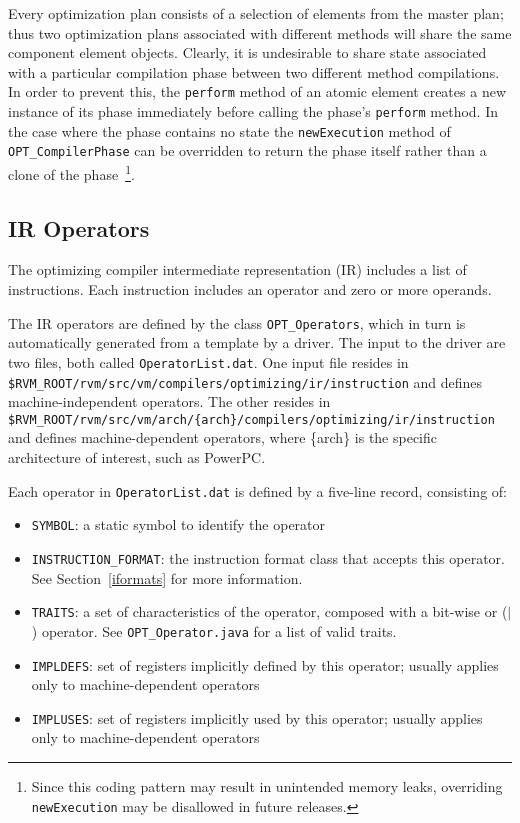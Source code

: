 Every optimization plan consists of a selection of elements from the master 
plan;
thus two optimization plans associated with different methods 
will share the same component element objects. 
Clearly, it is undesirable to share state 
associated with a particular compilation phase between two
different method compilations. In order to prevent this, the {\tt perform}
method of an atomic element creates a new instance of its phase immediately 
before calling the phase's {\tt perform} method. 
In the case where the phase
contains no state the {\tt newExecution} method of 
{\tt OPT\_CompilerPhase} can be overridden to return the phase itself rather 
than a clone of the phase~\footnote{Since this coding pattern may result
in unintended memory leaks, overriding {\tt newExecution} may be
disallowed in future releases.}.


\subsection{IR Operators}

The optimizing compiler intermediate representation (IR) includes a list
of instructions.  Each instruction includes an operator and zero or
more operands.

The IR operators are defined by the class {\tt OPT\_Operators}, which in
turn is automatically generated from a template by a driver.  The input to the
driver are two files, both called {\tt OperatorList.dat}.  One input
file resides in {\tt \$RVM\_ROOT/rvm/src/vm/compilers/optimizing/ir/instruction} and defines machine-independent
operators.  The other resides in {\tt \$RVM\_ROOT/rvm/src/vm/arch/\{arch\}/compilers/optimizing/ir/instruction}
and defines machine-dependent operators, where \{arch\} is the
specific architecture of interest, such as PowerPC\TMweb.

Each operator in {\tt OperatorList.dat} is defined by a five-line record,
consisting of:
\begin{itemize}
\item {\tt SYMBOL}: a static symbol to identify the operator
\item {\tt INSTRUCTION\_FORMAT}: the instruction format class that accepts this operator.  See Section~\ref{iformats} for more information.
\item {\tt TRAITS}: a set of characteristics of the operator, composed with a bit-wise or ($|$) operator.  See {\tt OPT\_Operator.java} for a list of valid traits.
\item {\tt IMPLDEFS}: set of registers implicitly defined by this operator; usually applies only to machine-dependent operators
\item {\tt IMPLUSES}: set of registers implicitly used by this operator; usually applies only to machine-dependent operators
\end{itemize}

